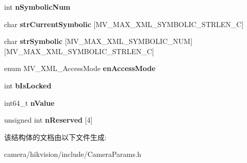 \begin{DoxyCompactItemize}
\item 
\mbox{\label{struct___m_v___x_m_l___f_e_a_t_u_r_e___enumeration___aee0183b12a9af6314a01cbf0789be74c}} 
int {\bfseries n\+Symbolic\+Num}
\item 
\mbox{\label{struct___m_v___x_m_l___f_e_a_t_u_r_e___enumeration___a03f4b71269aa86feace74fa724fbcfe9}} 
char {\bfseries str\+Current\+Symbolic} \mbox{[}M\+V\+\_\+\+M\+A\+X\+\_\+\+X\+M\+L\+\_\+\+S\+Y\+M\+B\+O\+L\+I\+C\+\_\+\+S\+T\+R\+L\+E\+N\+\_\+C\mbox{]}
\item 
\mbox{\label{struct___m_v___x_m_l___f_e_a_t_u_r_e___enumeration___a47be2b0048fadb9c75305368157e7a9e}} 
char {\bfseries str\+Symbolic} \mbox{[}M\+V\+\_\+\+M\+A\+X\+\_\+\+X\+M\+L\+\_\+\+S\+Y\+M\+B\+O\+L\+I\+C\+\_\+\+N\+UM\mbox{]}\mbox{[}M\+V\+\_\+\+M\+A\+X\+\_\+\+X\+M\+L\+\_\+\+S\+Y\+M\+B\+O\+L\+I\+C\+\_\+\+S\+T\+R\+L\+E\+N\+\_\+C\mbox{]}
\item 
\mbox{\label{struct___m_v___x_m_l___f_e_a_t_u_r_e___enumeration___a99724e4b5c310ac673f389e1c7788a5c}} 
enum M\+V\+\_\+\+X\+M\+L\+\_\+\+Access\+Mode {\bfseries en\+Access\+Mode}
\item 
\mbox{\label{struct___m_v___x_m_l___f_e_a_t_u_r_e___enumeration___a442a51aa8e6bd9be7cd1dd852b420dc0}} 
int {\bfseries b\+Is\+Locked}
\item 
\mbox{\label{struct___m_v___x_m_l___f_e_a_t_u_r_e___enumeration___aa54dbc48e9b171dd5109952e4df342ee}} 
int64\+\_\+t {\bfseries n\+Value}
\item 
\mbox{\label{struct___m_v___x_m_l___f_e_a_t_u_r_e___enumeration___a15a412e73fb8f58027cfb0fec60b543a}} 
unsigned int {\bfseries n\+Reserved} \mbox{[}4\mbox{]}
\end{DoxyCompactItemize}


该结构体的文档由以下文件生成\+:\begin{DoxyCompactItemize}
\item 
camera/hikvision/include/Camera\+Params.\+h\end{DoxyCompactItemize}
